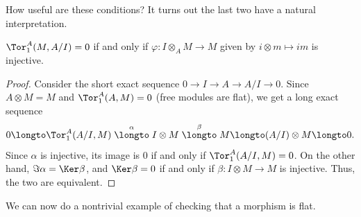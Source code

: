How useful are these conditions? It turns out the last two have a natural interpretation.
\begin{theorem}
    $\Tor_1^A(M,A/I) = 0$ if and only if $\varphi:I\otimes_A M\to M$ given by $i\otimes m\mapsto im$ is injective.
\end{theorem}
\begin{proof}
    Consider the short exact sequence $0\to I\to A\to A/I\to 0$. Since $A\otimes M=M$ and $\Tor_1^A(A,M)=0$ (free modules are flat), we get a long exact sequence \[0\longto \Tor_1^A(A/I,M)\stackrel\alpha\longto I\otimes M\stackrel\beta\longto M\longto (A/I)\otimes M\longto 0.\] Since $\alpha$ is injective, its image is $0$ if and only if $\Tor_1^A(A/I,M)=0$. On the other hand, $\Im \alpha = \Ker \beta$, and $\Ker \beta=0$ if and only if $\beta: I\otimes M\to M$ is injective. Thus, the two are equivalent.
\end{proof}
We can now do a nontrivial example of checking 
that a morphism is flat.
